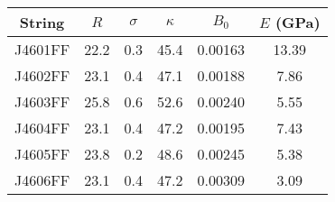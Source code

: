\begin{tabular}{cccccc}
\toprule
String & $R$ & $\sigma$ & $\kappa$ & $B_0$ & $E$ (GPa) \\
\midrule
J4601FF & 22.2 & 0.3 & 45.4 & 0.00163 & 13.39 \\
J4602FF & 23.1 & 0.4 & 47.1 & 0.00188 & 7.86 \\
J4603FF & 25.8 & 0.6 & 52.6 & 0.00240 & 5.55 \\
J4604FF & 23.1 & 0.4 & 47.2 & 0.00195 & 7.43 \\
J4605FF & 23.8 & 0.2 & 48.6 & 0.00245 & 5.38 \\
J4606FF & 23.1 & 0.4 & 47.2 & 0.00309 & 3.09 \\
\bottomrule
\end{tabular}

